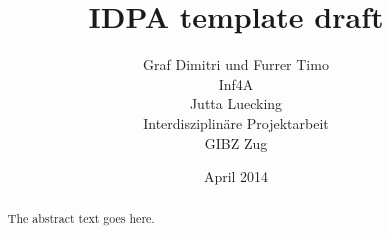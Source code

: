 \documentclass[12pt,a4paper,titlepage]{report}
\begin{document}
\title{IDPA template draft}
\author{Graf Dimitri und Furrer Timo\\
  Inf4A\\
  Jutta Luecking\\
  Interdisziplinäre Projektarbeit\\
  GIBZ Zug}
\date{April 2014}
\maketitle

\tableofcontents
\newpage

\begin{abstract}
The abstract text goes here.

\end{abstract}


\end{document}
